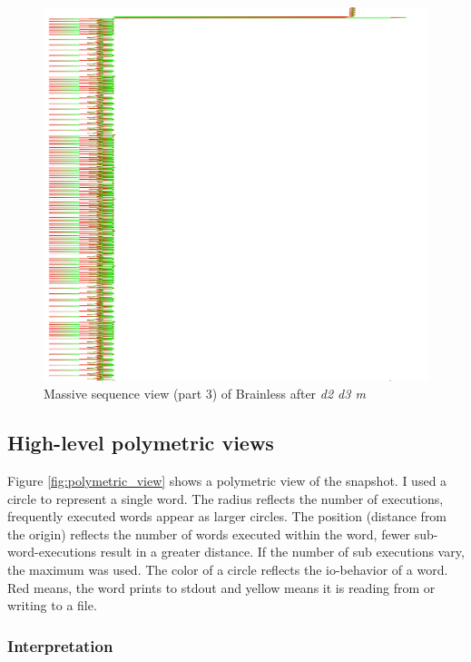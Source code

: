\begin{figure}[p]
    \centering
    \includegraphics[scale=0.52]{graphics/massive_sequence_view-dir_file_word_3.png}
    \caption{Massive sequence view (part 3) of Brainless after \emph{d2 d3 m}}
    \label{fig:massive_sequence_view_3}
\end{figure}

\subsection*{High-level polymetric views}

Figure \ref{fig:polymetric_view} shows a polymetric view of the snapshot. 
I used a circle to represent a single word. The radius reflects the number of executions, frequently executed words appear as larger circles. The position (distance from the origin) reflects the number of words executed within the word, fewer sub-word-executions result in a greater distance. If the number of sub executions vary, the maximum was used. The color of a circle reflects the io-behavior of a word. Red means, the word prints to stdout and yellow means it is reading from or writing to a file.

\subsubsection*{Interpretation}

